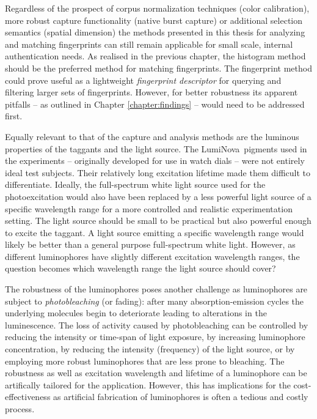 \documentclass[thesis.tex]{subfiles}
\begin{document}
Regardless of the prospect of corpus normalization techniques (color calibration), more robust capture functionality (native burst capture) or additional selection semantics (spatial dimension) the methods presented in this thesis for analyzing and matching fingerprints can still remain applicable for small scale, internal authentication needs. As realised in the previous chapter, the histogram method should be the preferred method for matching fingerprints. The fingerprint method could prove useful as a lightweight \emph{fingerprint descriptor} for querying and filtering larger sets of fingerprints. However, for better robustness its apparent pitfalls -- as outlined in Chapter \ref{chapter:findings} -- would need to be addressed first.

Equally relevant to that of the capture and analysis methods are the luminous properties of the taggants and the light source. The LumiNova\textregistered\ pigments used in the experiments -- originally developed for use in watch dials -- were not entirely ideal test subjects. Their relatively long excitation lifetime made them difficult to differentiate. Ideally, the full-spectrum white light source used for the photoexcitation would also have been replaced by a less powerful light source of a specific wavelength range for a more controlled and realistic experimentation setting. The light source should be small to be practical but also powerful enough to excite the taggant. A light source emitting a specific wavelength range would likely be better than a general purpose full-spectrum white light. However, as different luminophores have slightly different excitation wavelength ranges, the question becomes which wavelength range the light source should cover?

The robustness of the luminophores poses another challenge as luminophores are subject to \emph{photobleaching} (or fading): after many absorption-emission cycles the underlying molecules begin to deteriorate leading to alterations in the luminescence. The loss of activity caused by photobleaching can be controlled by reducing the intensity or time-span of light exposure, by increasing luminophore concentration, by reducing the intensity (frequency) of the light source, or by employing more robust luminophores that are less prone to bleaching. The robustness as well as excitation wavelength and lifetime of a luminophore can be artifically tailored for the application. However, this has implications for the cost-effectiveness as artificial fabrication of luminophores is often a tedious and costly process.
\end{document}
